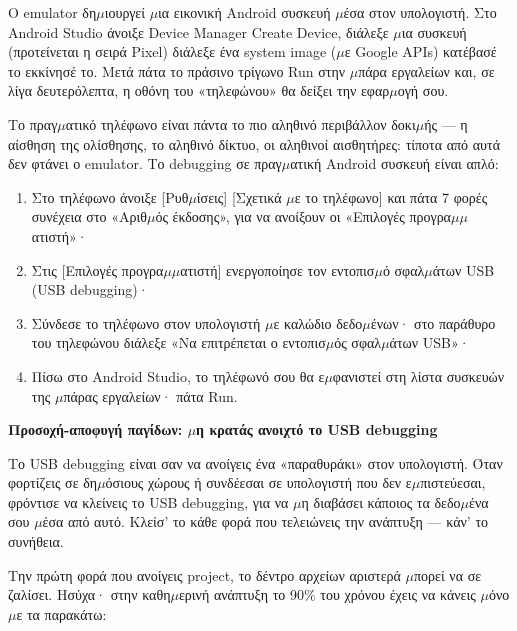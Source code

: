 Ο emulator δη$\mu$ιουργεί $\mu$ια εικονική Android συσκευή $\mu$έσα στον υπολογιστή. Στο Android Studio άνοιξε Device Manager Create Device, διάλεξε $\mu$ια συσκευή (προτείνεται η σειρά Pixel) διάλεξε ένα system image ($\mu$ε Google APIs) κατέβασέ το εκκίνησέ το. Μετά πάτα το πράσινο τρίγωνο Run στην $\mu$πάρα εργαλείων και, σε λίγα δευτερόλεπτα, η οθόνη του «τηλεφώνου» θα δείξει την εφαρ$\mu$ογή σου.


Το πραγ$\mu$ατικό τηλέφωνο είναι πάντα το πιο αληθινό περιβάλλον δοκι$\mu$ής — η αίσθηση της ολίσθησης, το αληθινό δίκτυο, οι αληθινοί αισθητήρες: τίποτα από αυτά δεν φτάνει ο emulator. Το debugging σε πραγ$\mu$ατική Android συσκευή είναι απλό:

\begin{enumerate}
  \item Στο τηλέφωνο άνοιξε [Ρυθ$\mu$ίσεις] [Σχετικά $\mu$ε το τηλέφωνο] και πάτα 7 φορές συνέχεια στο «Αριθ$\mu$ός έκδοσης», για να ανοίξουν οι «Επιλογές προγρα$\mu$$\mu$ατιστή»·
  \item Στις [Επιλογές προγρα$\mu$$\mu$ατιστή] ενεργοποίησε τον εντοπισ$\mu$ό σφαλ$\mu$άτων USB (USB debugging)·
  \item Σύνδεσε το τηλέφωνο στον υπολογιστή $\mu$ε καλώδιο δεδο$\mu$ένων· στο παράθυρο του τηλεφώνου διάλεξε «Να επιτρέπεται ο εντοπισ$\mu$ός σφαλ$\mu$άτων USB»·
  \item Πίσω στο Android Studio, το τηλέφωνό σου θα ε$\mu$φανιστεί στη λίστα συσκευών της $\mu$πάρας εργαλείων· πάτα Run.
\end{enumerate}

\textbf{Προσοχή-αποφυγή παγίδων: $\mu$η κρατάς ανοιχτό το USB debugging}\par

Το USB debugging είναι σαν να ανοίγεις ένα «παραθυράκι» στον υπολογιστή. Όταν φορτίζεις σε δη$\mu$όσιους χώρους ή συνδέεσαι σε υπολογιστή που δεν ε$\mu$πιστεύεσαι, φρόντισε να κλείνεις το USB debugging, για να $\mu$η διαβάσει κάποιος τα δεδο$\mu$ένα σου $\mu$έσα από αυτό. Κλείσ' το κάθε φορά που τελειώνεις την ανάπτυξη — κάν' το συνήθεια.


Την πρώτη φορά που ανοίγεις project, το δέντρο αρχείων αριστερά $\mu$πορεί να σε ζαλίσει. Ησύχα· στην καθη$\mu$ερινή ανάπτυξη το 90\% του χρόνου έχεις να κάνεις $\mu$όνο $\mu$ε τα παρακάτω:

